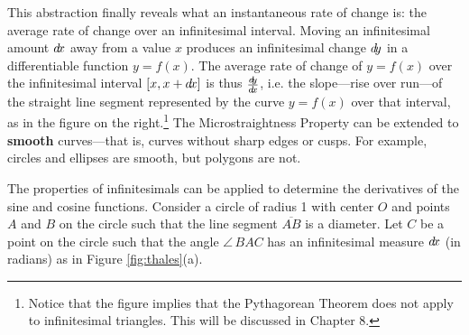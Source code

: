 This abstraction finally reveals what an instantaneous rate of change
is: the average rate of change over an infinitesimal interval. Moving an
infinitesimal amount $d\!x$ away from a value $x$ produces an infinitesimal
change $d\!y$ in a differentiable function $y=f(x)$. The average rate of change
of $y=f(x)$ over the infinitesimal interval $\lbrack x,x+d\!x \rbrack$ is thus $\frac{d\negmedspace y}{d\!x}$,
i.e. the slope---rise over run---of the straight line segment represented by
the curve $y=f(x)$ over that interval, as in the figure on the
right.\footnote{Notice that the figure implies that the Pythagorean Theorem
does not apply to infinitesimal triangles. This will be discussed in Chapter 8.}
\newpage
The Microstraightness Property can be extended to \textbf{smooth} curves---that
is, curves without sharp edges or cusps. For example,
circles and ellipses are smooth, but polygons are not.

The properties of infinitesimals can be applied to determine the
derivatives of the sine and cosine functions.
Consider a circle of radius 1 with center $O$ and points
$A$ and $B$ on the circle such that the line segment $\overline{AB}$ is a
diameter. Let $C$ be a point on the circle such that the angle $\angle\,BAC$
has an infinitesimal measure $d\!x$ (in radians) as in Figure
\ref{fig:thales}(a).

